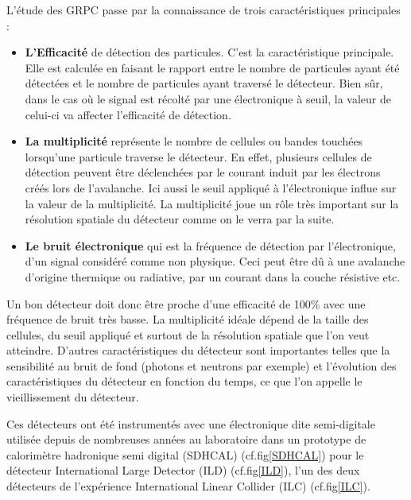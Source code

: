 L'étude des GRPC passe par la connaissance de trois caractéristiques principales :
\begin{itemize}[label=$\bullet$]
	\item \textbf{L'Efficacité} de détection des particules. C'est la caractéristique principale. Elle est calculée en faisant le rapport entre le nombre de particules ayant été détectées et le nombre de particules ayant traversé le détecteur. Bien sûr, dans le cas où le signal est récolté par une électronique à seuil, la valeur de celui-ci va affecter l'efficacité de détection.
	\item \textbf{La multiplicité} représente le nombre de cellules ou bandes touchées lorsqu'une particule traverse le détecteur. En effet, plusieurs cellules de détection peuvent être déclenchées par le courant induit par les électrons créés lors de l'avalanche. Ici aussi le seuil appliqué à l'électronique influe sur la valeur de la multiplicité. La multiplicité joue un rôle très important sur la résolution spatiale du détecteur comme on le verra par la suite.
	\item \textbf{Le bruit électronique} qui est la fréquence de détection par l'électronique, d'un signal considéré comme non physique. Ceci peut être dû à une avalanche d'origine thermique ou radiative, par un courant dans la couche résistive etc. 
\end{itemize}

Un bon détecteur doit donc être proche d'une efficacité de 100\% avec une fréquence de bruit très basse. La multiplicité idéale dépend de la taille des cellules, du seuil appliqué et surtout de la résolution spatiale que l'on veut atteindre. D'autres caractéristiques du détecteur sont importantes telles que la sensibilité au bruit de fond (photons et neutrons par exemple) et l'évolution des caractéristiques du détecteur en fonction du temps, ce que l'on appelle le vieillissement du détecteur.

Ces détecteurs ont été instrumentés avec une électronique dite semi-digitale utilisée depuis de nombreuses années au laboratoire dans un prototype de calorimètre hadronique semi digital (SDHCAL) (cf.fig\ref{SDHCAL}) \cite{Buridon:2016ill} pour le détecteur International Large Detector (ILD) (cf.fig\ref{ILD}), l'un des deux détecteurs de l'expérience International Linear Collider (ILC) (cf.fig\ref{ILC}).

